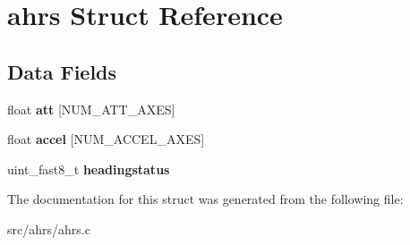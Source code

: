 \hypertarget{structahrs}{}\section{ahrs Struct Reference}
\label{structahrs}
\subsection*{Data Fields}
\begin{DoxyCompactItemize}
\item 
\mbox{\label{structahrs_a7b92888fbfc073802a234cab3479e7e7}} 
float {\bfseries att} \mbox{[}N\+U\+M\+\_\+\+A\+T\+T\+\_\+\+A\+X\+ES\mbox{]}
\item 
\mbox{\label{structahrs_a365aa0c5a3d97d0479974746e9f9b70d}} 
float {\bfseries accel} \mbox{[}N\+U\+M\+\_\+\+A\+C\+C\+E\+L\+\_\+\+A\+X\+ES\mbox{]}
\item 
\mbox{\label{structahrs_a04fdfc7a9181b6e4aa36e643c7c1e485}} 
uint\+\_\+fast8\+\_\+t {\bfseries headingstatus}
\end{DoxyCompactItemize}


The documentation for this struct was generated from the following file\+:\begin{DoxyCompactItemize}
\item 
src/ahrs/ahrs.\+c\end{DoxyCompactItemize}
